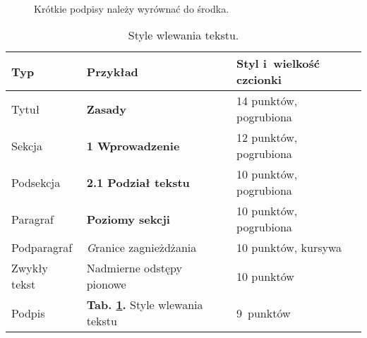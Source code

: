 {

\begin{figure}[!h]
	\vspace{-10pt}
	\centering
	\\
		\caption{Krótkie podpisy należy wyrównać do środka.}
		\label{fig:devop}
\end{figure}
}


\begin{table}[!h]
	\vspace{-4mm}
	\caption{
		Style wlewania tekstu.
	}
	\begin{center}
		\begin{tabular}{lll}
			\hline
			Typ & Przykład & Styl i~wielkość czcionki\\
			\hline
			Tytuł & {\Large\bfseries Zasady} & 14 punktów, pogrubiona\\
			Sekcja &  {\large\bfseries 1 Wprowadzenie} & 12 punktów, pogrubiona\\
			Podsekcja & {\bfseries 2.1 Podział tekstu} & 10 punktów, pogrubiona\\
			Paragraf & {\bfseries Poziomy sekcji} & 10 punktów, pogrubiona\\
			Podparagraf & {\textit Granice zagnieżdżania} & 10 punktów, kursywa\\
			Zwykły tekst & Nadmierne odstępy pionowe & 10 punktów\\
			Podpis & {\small\textbf{Tab. \ref{tab:styles}.} Style wlewania tekstu} & 9~punktów\\
			\hline
		\end{tabular}
	\end{center}
	\label{tab:styles}
	\vspace{-6mm}
\end{table}

